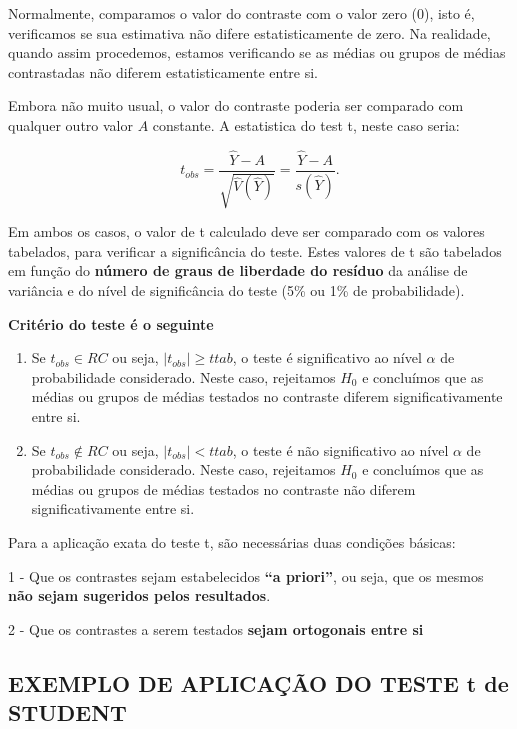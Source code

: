 \documentclass[
]{book}
\begin{document}
Normalmente, comparamos o valor do contraste com o valor zero (0), isto é, verificamos se sua estimativa não difere estatisticamente de zero. Na realidade, quando assim procedemos, estamos verificando se as médias ou grupos de médias contrastadas não diferem estatisticamente entre si.

Embora não muito usual, o valor do contraste poderia ser comparado com qualquer outro valor \(A\) constante. A estatistica do test t, neste caso seria:

\[
t_{obs} = \frac{\hat{Y}-A}{\sqrt{\hat{V}(\hat{Y})}} = \frac{\hat{Y}-A}{s(\hat{Y})}.
\]

Em ambos os casos, o valor de t calculado deve ser comparado com os valores tabelados, para verificar a significância do teste. Estes valores de t são tabelados em função do \textbf{número de graus de liberdade do resíduo} da análise de variância e do nível de significância do teste (5\% ou 1\% de probabilidade).

\textbf{Critério do teste é o seguinte}

\begin{enumerate}
\def\labelenumi{\alph{enumi})}
\item
  Se \(t_{obs} \in RC\) ou seja, \(|t_{obs}| \ge t{tab}\), o teste é significativo ao nível \(\alpha\) de probabilidade considerado. Neste caso, rejeitamos \(H_0\) e concluímos que as médias ou grupos de médias testados no contraste diferem significativamente entre si.
\item
  Se \(t_{obs} \not \in RC\) ou seja, \(|t_{obs}| < t{tab}\), o teste é não significativo ao nível \(\alpha\) de probabilidade considerado. Neste caso, rejeitamos \(H_0\) e concluímos que as médias ou grupos de médias testados no contraste não diferem significativamente entre si.
\end{enumerate}

Para a aplicação exata do teste t, são necessárias duas condições básicas:

1 - Que os contrastes sejam estabelecidos \textbf{``a priori''}, ou seja, que os mesmos \textbf{não sejam sugeridos pelos resultados}.

2 - Que os contrastes a serem testados \textbf{sejam ortogonais entre si}

\hypertarget{exemplo-de-aplicauxe7uxe3o-do-teste-t-de-student}{%
\subsection{EXEMPLO DE APLICAÇÃO DO TESTE t de STUDENT}\label{exemplo-de-aplicauxe7uxe3o-do-teste-t-de-student}}
\end{document}
